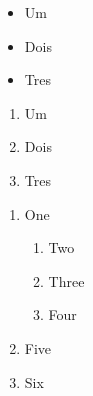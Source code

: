 \documentclass{article}
\begin{document}
\begin{itemize}
	\item Um
	\item Dois
	\item Tres
\end{itemize}

\newpage

\begin{enumerate}
	\item Um
	\item Dois
	\item Tres
\end{enumerate}

\newpage

\begin{enumerate}[label=\arabic*)]
	\item One
	      \begin{enumerate}[label=\alph*)]
	      	\item Two
	      	\item Three
	      	\item Four
	      \end{enumerate}
	\item Five
	\item Six
\end{enumerate}
\end{document}
